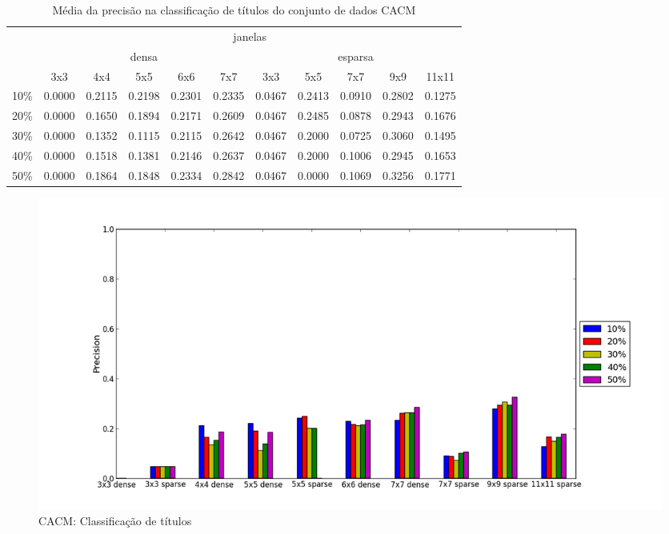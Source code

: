 \documentclass[a4paper,11pt]{article}
\begin{document}
  \begin{center}
    \begin{table}[p]
      \caption{Média da precisão na classificação de títulos do conjunto de dados CACM}
      \begin{tabular}{ l | c c c c c || c c c c c | }
        \cline{2-11}
        & \multicolumn{10}{|c|}{janelas} \\
        \cline{2-11}
        & \multicolumn{5}{c||}{densa} & \multicolumn{5}{c|}{esparsa} \\
        \cline{2-11}
        & 3x3 & 4x4 & 5x5 & 6x6 & 7x7 & 3x3 & 5x5 & 7x7 & 9x9 & 11x11 \\
        \hline
        \multicolumn{1}{|l|}{10\%}& 0.0000& 0.2115& 0.2198& 0.2301& 0.2335& 0.0467& 0.2413& 0.0910& 0.2802& 0.1275\\
        \multicolumn{1}{|l|}{20\%}& 0.0000& 0.1650& 0.1894& 0.2171& 0.2609& 0.0467& 0.2485& 0.0878& 0.2943& 0.1676\\
        \multicolumn{1}{|l|}{30\%}& 0.0000& 0.1352& 0.1115& 0.2115& 0.2642& 0.0467& 0.2000& 0.0725& 0.3060& 0.1495\\
        \multicolumn{1}{|l|}{40\%}& 0.0000& 0.1518& 0.1381& 0.2146& 0.2637& 0.0467& 0.2000& 0.1006& 0.2945& 0.1653\\
        \multicolumn{1}{|l|}{50\%}& 0.0000& 0.1864& 0.1848& 0.2334& 0.2842& 0.0467& 0.0000& 0.1069& 0.3256& 0.1771\\
        \hline  
      \end{tabular}
    \end{table}
  \end{center}
    
  \begin{figure}[p]
    \centerline{\includegraphics[width=1.2\textwidth]{assets/experiment_charts/cacm_TextRegion_heading_precision.png}}
    \caption{CACM: Classificação de títulos}
    \label{fig:cacm_TextRegion_heading_precision}
  \end{figure}
\end{document}
